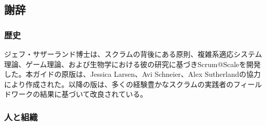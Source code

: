 \documentclass[12pt,a4paper,parskip=full]{scrartcl}
\begin{document}

\subsection{謝辞}\label{Acknowledgements}

\subsubsection{歴史}\label{History}

ジェフ・サザーランド博士は、スクラムの背後にある原則、複雑系適応システム理論、ゲーム理論、および生物学における彼の研究に基づきScrum@Scaleを開発した。本ガイドの原版は、Jessica Larsen、Avi Schneier、Alex Sutherlandの協力により作成された。以降の版は、多くの経験豊かなスクラムの実践者のフィールドワークの結果に基づいて改良されている。

\subsubsection{人と組織}\label{People-and-Organizations}
\end{document}
